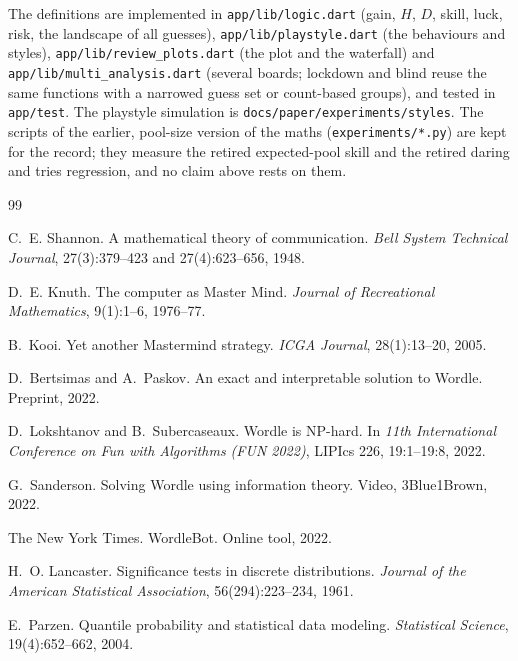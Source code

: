 \documentclass[11pt]{article}
\theoremstyle{definition}
\theoremstyle{remark}
\begin{document}
The definitions are implemented in \texttt{app/lib/logic.dart} (gain, $H$, $D$, skill,
luck, risk, the landscape of all guesses), \texttt{app/lib/playstyle.dart} (the
behaviours and styles), \texttt{app/lib/review\_plots.dart} (the plot and the waterfall)
and \texttt{app/lib/multi\_analysis.dart} (several boards; lockdown and blind reuse the same functions with a narrowed guess set or count-based groups), and tested in
\texttt{app/test}. The playstyle simulation is
\texttt{docs/paper/experiments/styles}. The scripts of the earlier,
pool-size version of the maths (\texttt{experiments/*.py}) are kept for the record;
they measure the retired expected-pool skill and the retired daring and tries
regression, and no claim above rests on them.

\begin{thebibliography}{99}

 C.~E. Shannon. A mathematical theory of communication.
\emph{Bell System Technical Journal}, 27(3):379--423 and 27(4):623--656, 1948.

 D.~E. Knuth. The computer as Master Mind.
\emph{Journal of Recreational Mathematics}, 9(1):1--6, 1976--77.

 B.~Kooi. Yet another Mastermind strategy.
\emph{ICGA Journal}, 28(1):13--20, 2005.

 D.~Bertsimas and A.~Paskov. An exact and interpretable
solution to Wordle. Preprint, 2022.

 D.~Lokshtanov and B.~Subercaseaux. Wordle is NP-hard.
In \emph{11th International Conference on Fun with Algorithms (FUN 2022)}, LIPIcs 226,
19:1--19:8, 2022.

 G.~Sanderson. Solving Wordle using information theory.
Video, 3Blue1Brown, 2022.

 The New York Times. WordleBot. Online tool, 2022.

 H.~O. Lancaster. Significance tests in discrete distributions.
\emph{Journal of the American Statistical Association}, 56(294):223--234, 1961.

 E.~Parzen. Quantile probability and statistical data modeling.
\emph{Statistical Science}, 19(4):652--662, 2004.

\end{thebibliography}
\end{document}
